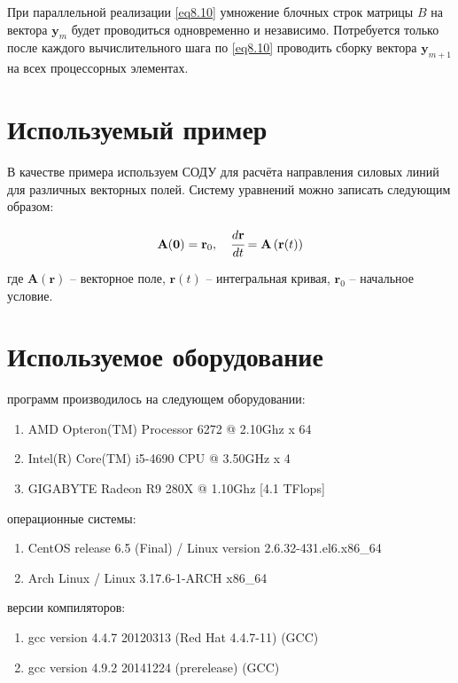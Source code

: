\documentclass[14pt,final,titlepage,pscyr]{hedwork}
\renewcommand{\vec}[1]{\mathbf{#1}}
\begin{document}
	При параллельной реализации \eqref{eq8.10} умножение блочных строк матрицы \( B \) на вектора 
	\( \vec{y}_m \) будет проводиться одновременно и независимо. Потребуется только после каждого 
	вычислительного шага по \eqref{eq8.10} проводить сборку вектора \( \vec{y}_{m+1} \) на всех процессорных 
	элементах.\cite{methods}

\section{Используемый пример}
В качестве примера используем СОДУ для расчёта направления силовых линий для различных векторных 
полей. Систему уравнений можно записать следующим образом:

\[
	\vec{A}(\vec{0}) = \vec{r}_0, \quad \cfrac{d\vec{r}}{dt} = \vec{A}\left( \vec{r}(t) \right)
\]

где \( \vec{A}(\vec{r}) \) -- векторное поле, \( \vec{r}(t) \) -- интегральная кривая, 
\( \vec{r}_0 \) -- начальное условие.

\newpage

\section{Используемое оборудование}
 программ производилось на следующем оборудовании:
\begin{enumerate}
	\item AMD Opteron(TM) Processor 6272 @ 2.10Ghz x 64
	\item Intel(R) Core(TM) i5-4690 CPU @ 3.50GHz x 4
	\item GIGABYTE Radeon R9 280X @ 1.10Ghz [4.1 TFlops]
\end{enumerate}

 операционные системы:
\begin{enumerate}
	\item CentOS release 6.5 (Final) / Linux version 2.6.32-431.el6.x86\_64
	\item Arch Linux / Linux 3.17.6-1-ARCH x86\_64
\end{enumerate}

 версии компиляторов:
\begin{enumerate}
	\item gcc version 4.4.7 20120313 (Red Hat 4.4.7-11) (GCC)
	\item gcc version 4.9.2 20141224 (prerelease) (GCC) 
\end{enumerate}
\end{document}
